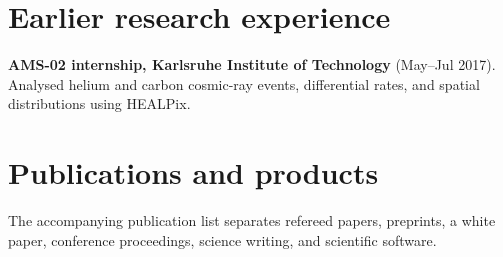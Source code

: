 \documentclass[11pt]{article}
\begin{document}
\section*{Earlier research experience}
\textbf{AMS-02 internship, Karlsruhe Institute of Technology} (May--Jul 2017). Analysed helium and carbon cosmic-ray events, differential rates, and spatial distributions using HEALPix.

\section*{Publications and products}
The accompanying publication list separates refereed papers, preprints, a white paper, conference proceedings, science writing, and scientific software.
\end{document}
